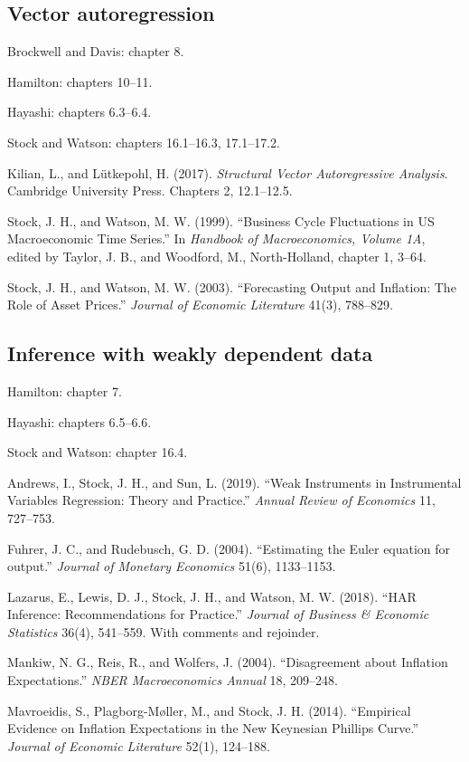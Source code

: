 \documentclass[12pt]{article}
\begin{document}
\subsection{Vector autoregression}
\begin{description}
\item Brockwell and Davis: chapter 8.
\item Hamilton: chapters 10--11.
\item Hayashi: chapters 6.3--6.4.
\item[*] Stock and Watson: chapters 16.1--16.3, 17.1--17.2.
\item Kilian, L., and L\"{u}tkepohl, H. (2017). \emph{Structural Vector Autoregressive Analysis}. Cambridge University Press. Chapters 2, 12.1--12.5.
\item[*] Stock, J. H., and Watson, M. W. (1999). ``Business Cycle Fluctuations in US Macroeconomic Time Series.'' In \emph{Handbook of Macroeconomics, Volume 1A}, edited by Taylor, J. B., and Woodford, M., North-Holland, chapter 1, 3--64.
\item Stock, J. H., and Watson, M. W. (2003). ``Forecasting Output and Inflation: The Role of Asset Prices.'' \emph{Journal of Economic Literature} 41(3), 788--829.
\end{description}

\subsection{Inference with weakly dependent data}
\begin{description}
\item Hamilton: chapter 7.
\item Hayashi: chapters 6.5--6.6.
\item[*] Stock and Watson: chapter 16.4.
\item Andrews, I., Stock, J. H., and Sun, L. (2019). ``Weak Instruments in Instrumental Variables Regression: Theory and Practice.'' \emph{Annual Review of Economics} 11, 727--753.
\item Fuhrer, J. C., and Rudebusch, G. D. (2004). ``Estimating the Euler equation for output.'' \emph{Journal of Monetary Economics} 51(6), 1133--1153.
\item Lazarus, E., Lewis, D. J., Stock, J. H., and Watson, M. W. (2018). ``HAR Inference: Recommendations for Practice.'' \emph{Journal of Business \& Economic Statistics} 36(4), 541--559. With comments and rejoinder.
\item Mankiw, N. G., Reis, R., and Wolfers, J. (2004). ``Disagreement about Inflation Expectations.'' \emph{NBER Macroeconomics Annual} 18, 209--248.
\item Mavroeidis, S., Plagborg-M{\o}ller, M., and Stock, J. H. (2014). ``Empirical Evidence on Inflation Expectations in the New Keynesian Phillips Curve.'' \emph{Journal of Economic Literature} 52(1), 124--188.
\end{description}
\end{document}
